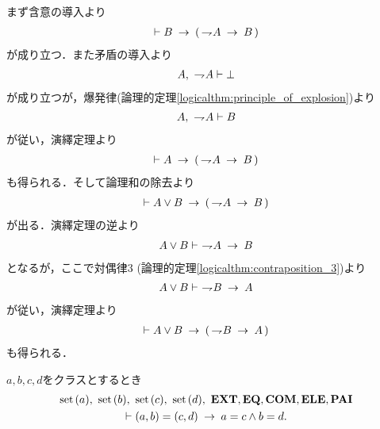 	\begin{sketch}
		まず含意の導入より
		\begin{align}
			\vdash B \hspace{0.25em}\rightarrow\hspace{0.25em} (\, \rightharpoondown\hspace{-0.25em} A \hspace{0.25em}\rightarrow\hspace{0.25em} B\, )
		\end{align}
		が成り立つ．また矛盾の導入より
		\begin{align}
			A,\ \rightharpoondown\hspace{-0.25em} A \vdash \bot
		\end{align}
		が成り立つが，爆発律(論理的定理\ref{logicalthm:principle_of_explosion})より
		\begin{align}
			A,\ \rightharpoondown\hspace{-0.25em} A \vdash B
		\end{align}
		が従い，演繹定理より
		\begin{align}
			\vdash A \hspace{0.25em}\rightarrow\hspace{0.25em} (\, \rightharpoondown\hspace{-0.25em} A \hspace{0.25em}\rightarrow\hspace{0.25em} B\, )
		\end{align}
		も得られる．そして論理和の除去より
		\begin{align}
			\vdash A \vee B \hspace{0.25em}\rightarrow\hspace{0.25em} (\, \rightharpoondown\hspace{-0.25em} A \hspace{0.25em}\rightarrow\hspace{0.25em} B\, )
		\end{align}
		が出る．演繹定理の逆より
		\begin{align}
			A \vee B \vdash\ \rightharpoondown\hspace{-0.25em} A \hspace{0.25em}\rightarrow\hspace{0.25em} B
		\end{align}
		となるが，ここで対偶律$3$ (論理的定理\ref{logicalthm:contraposition_3})より
		\begin{align}
			A \vee B \vdash\ \rightharpoondown\hspace{-0.25em} B \hspace{0.25em}\rightarrow\hspace{0.25em} A
		\end{align}
		が従い，演繹定理より
		\begin{align}
			\vdash A \vee B \hspace{0.25em}\rightarrow\hspace{0.25em} (\, \rightharpoondown\hspace{-0.25em} B \hspace{0.25em}\rightarrow\hspace{0.25em} A\, )
		\end{align}
		も得られる．
		\QED
	\end{sketch}
	
	\begin{screen}
		\begin{thm}[順序対の相等性]
		\label{thm:equality_of_ordered_pairs}
			$a,b,c,d$をクラスとするとき
			\begin{align}
				\begin{gathered}
					\set{a},\ \set{b},\ \set{c},\ \set{d},\ \EXTAX,\EQAX,\COMAX,\ELEAX,\PAIAX \\
					\vdash (a,b) = (c,d) \rarrow a = c \wedge b = d.
				\end{gathered}
			\end{align}
		\end{thm}
	\end{screen}
	
